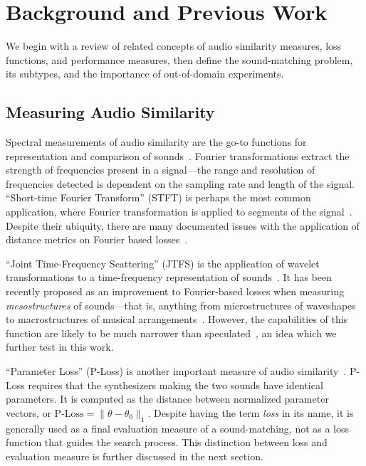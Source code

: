 \documentclass[10pt]{article} %
\begin{document}
\section{Background and Previous Work}
We begin with a review of related concepts of audio similarity measures, loss functions, and performance measures, then define the sound-matching problem, its subtypes, and the importance of out-of-domain experiments.

\subsection{Measuring Audio Similarity}
\label{sec:measuring_audio_similarity}

Spectral measurements of audio similarity are the go-to functions for representation and comparison of sounds~\cite{smith2007mathematics}. Fourier transformations extract the strength of frequencies present in a signal---the range and resolution of frequencies detected is dependent on the sampling rate and length of the signal. ``Short-time Fourier Transform'' (STFT) is perhaps the most common application, where Fourier transformation is applied to segments of the signal~\cite{smith2007mathematics}. Despite their ubiquity, there are many documented issues with the application of distance metrics on Fourier based losses~\cite{turian2020sorry,salimi2025evaluating,vahidi2023mesostructures}.

``Joint Time-Frequency Scattering'' (JTFS) is the application of wavelet transformations to a time-frequency representation of sounds~\cite{vahidi2023mesostructures,anden2015joint}. It has been recently proposed as an improvement to Fourier-based losses when measuring \textit{mesostructures} of sounds---that is, anything from microstructures of waveshapes to macrostructures of musical arrangements~\cite{lostanlen2019shape,vahidi2023mesostructures}. However, the capabilities of this function are likely to be much narrower than speculated~\cite{salimi2025evaluating}, an idea which we further test in this work.

``Parameter Loss'' (P-Loss) is another important measure of audio similarity~\cite{yee2018automatic,esling2019flow}. P-Loss requires that the synthesizers making the two sounds have identical parameters. It is computed as the distance between normalized parameter vectors,  or $\text{P-Loss} = \|\theta - \theta_0\|_1$. Despite having the term \textit{loss} in its name, it is generally used as a final evaluation measure of a sound-matching, not as a loss function that guides the search process. This distinction between loss and evaluation measure is further discussed in the next section.
\end{document}
